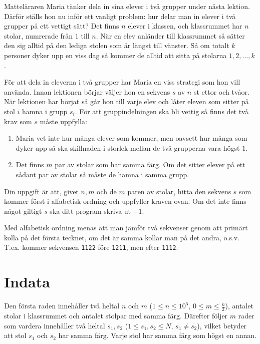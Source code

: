 Matteläraren Maria tänker dela in sina elever i två grupper under nästa lektion.
Därför ställs hon nu inför ett vanligt problem: hur delar man in elever i två grupper på ett vettigt sätt?
Det finns $n$ elever i klassen, och klassrummet har $n$ stolar, numrerade från $1$ till $n$.
När en elev anländer till klassrummet så sätter den sig alltid på den lediga stolen som är längst till vänster.
Så om totalt $k$ personer dyker upp en viss dag så kommer de alltid att sitta på stolarna $1,2,...,k$.

För att dela in eleverna i två grupper har Maria en viss strategi som hon vill använda.
Innan lektionen börjar väljer hon en sekvens $s$ av $n$ st ettor och tvåor.
När lektionen har börjat så går hon till varje elev och låter eleven som sitter på stol $i$ hamna i grupp $s_i$.
För att gruppindelningen ska bli vettig så finns det två krav som $s$ måste uppfylla:

\begin{enumerate}
  \item Maria vet inte hur många elever som kommer, men oavsett hur många som dyker upp så ska skillnaden i storlek mellan de två grupperna vara högst $1$.

  \item Det finns $m$ par av stolar som har samma färg. Om det sitter elever på ett sådant par av stolar så måste de hamna i samma grupp.
\end{enumerate}

Din uppgift är att, givet $n,m$ och de $m$ paren av stolar, hitta den sekvens $s$ som kommer först i alfabetisk ordning och uppfyller kraven ovan.
Om det inte finns något giltigt $s$ ska ditt program skriva ut $-1$.

Med alfabetisk ordning menas att man jämför två sekvenser genom att primärt kolla på det första tecknet, om det är samma kollar man på det andra, o.s.v.
T.ex. kommer sekvensen \texttt{1122} före \texttt{1211}, men efter \texttt{1112}.

\section*{Indata}
Den första raden innehåller två heltal $n$ och $m$ ($1\leq n \leq 10^5$, $0 \leq m \leq \frac{n}{2}$), antalet stolar i klassrummet och antalet stolpar med samma färg.
Därefter följer $m$ rader som vardera innehåller två heltal $s_{1}, s_{2}$ ($1 \leq s_{1}, s_{2} \leq N$, $s_{1} \neq s_{2}$), vilket betyder att stol $s_{1}$ och $s_{2}$ har samma färg.
Varje stol har samma färg som högst en annan.

